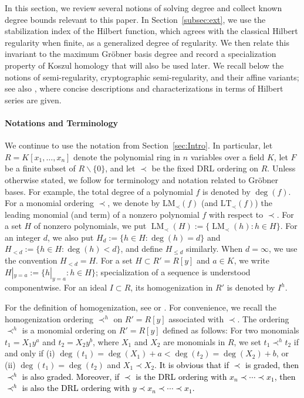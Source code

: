 \documentclass{article}
\theoremstyle{definition}
\theoremstyle{plain}
\theoremstyle{plain}
\theoremstyle{plain}
\theoremstyle{plain}
\numberwithin{equation}{subsection}
\begin{document}
In this section, we review several notions of solving degree and collect known degree bounds relevant to this paper.
In Section~\ref{subsec:ext}, we use the stabilization index of the Hilbert function, which agrees with the classical Hilbert regularity when finite, as a generalized degree of regularity.
We then relate this invariant to the maximum Gr\"obner basis degree and record a specialization property of Koszul homology that will also be used later.
We recall below the notions of semi-regularity, cryptographic semi-regularity, and their affine variants;
see also \cite[Section~2.1]{KY}, where concise descriptions and characterizations in terms of Hilbert series are given.

\paragraph{Notations and Terminology}
We continue to use the notation from Section~\ref{sec:Intro}.
In particular, let $R=K[x_1,\ldots,x_n]$ denote the polynomial ring in $n$ variables over a field $K$, let $F$ be a finite subset of $R\smallsetminus\{0\}$, and let $\prec$ be the fixed DRL ordering on $R$.
Unless otherwise stated, we follow \cite{Singular} for terminology and notation related to Gr\"obner bases.
For example, the total degree of a polynomial $f$ is denoted by $\deg(f)$. 
For a monomial ordering $\prec$, we denote by $\mathrm{LM}_{\prec}(f)$ (and $\mathrm{LT}_{\prec}(f)$) the leading monomial (and term) of a nonzero polynomial $f$ with respect to $\prec$. 
For a set $H$ of nonzero polynomials, we put $\operatorname{LM}_{\prec}(H):=\{\operatorname{LM}_{\prec}(h):h\in H\}$.
For an integer $d$, we also put $H_d:=\{h\in H:\deg(h)=d\}$ and $H_{<d}:=\{h\in H:\deg(h)<d\}$, and define $H_{\leq d}$ similarly.
When $d=\infty$, we use the convention $H_{<d}=H$.
For a set $H\subset R'=R[y]$ and $a\in K$, we write $H|_{y=a}:=\{h|_{y=a}:h\in H\}$; specialization of a sequence is understood componentwise.
For an ideal $I\subset R$, its homogenization in $R'$ is denoted by $I^h$.

For the definition of homogenization, see \cite[Chapter~2]{KR} or \cite[Section~3.1.1]{KY}.
For convenience, we recall the homogenization ordering $\prec^h$ on $R'=R[y]$ associated with $\prec$.
The ordering $\prec^h$ is a monomial ordering on $R'=R[y]$ defined as follows:
For two monomials $t_1=X_1y^a$ and $t_2=X_2y^b$, where $X_1$ and $X_2$ are monomials in $R$, we set $t_1\prec^h t_2$ if and only if {\rm (i)} $\deg(t_1)=\deg(X_1)+a<\deg(t_2)=\deg(X_2)+b$, or {\rm (ii)} $\deg(t_1)=\deg(t_2)$ and $X_1\prec X_2$.
\textcolor{black}{It is obvious that if $\prec$ is graded, then $\prec^h$ is also graded. 
Moreover, if $\prec$ is the DRL ordering with $x_n\prec\cdots \prec x_1$, then $\prec^h$ is also the DRL ordering with $y \prec x_n \prec \cdots \prec x_1$.}
\end{document}
